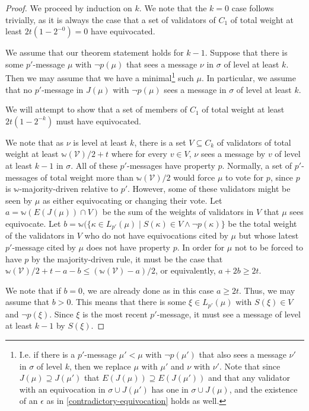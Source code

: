 \documentclass[12pt]{article}
\begin{document}
\begin{proof}
We proceed by induction on $k$. We note that the $k=0$ case follows trivially, as it is always the case that a set of validators of $C_1$ of total weight at least $2t(1-2^{-0})=0$ have equivocated.

  We assume that our theorem statement holds for $k-1$. Suppose that there is some $p'$-message $\mu$ with $\neg p(\mu)$ that sees a message $\nu$ in $\sigma$ of level at least $k$. Then we may assume that we have a minimal\footnote{I.e. if there is a $p'$-message $\mu' < \mu$ with $\neg p(\mu')$ that also sees a message $\nu'$ in $\sigma$ of level $k$, then we replace $\mu$ with $\mu'$ and $\nu$ with $\nu'$. Note that since $J(\mu)\supseteq J(\mu')$ that $E(J(\mu))\supseteq E(J(\mu'))$ and that any validator with an equivocation in $\sigma\cup J(\mu')$ has one in $\sigma\cup J(\mu)$, and the existence of an $\epsilon$ as in \ref{contradictory-equivocation} holds as well.} such $\mu$. In particular, we assume that no $p'$-message in $J(\mu)$ with $\neg p(\mu)$ sees a message in $\sigma$ of level at least $k$.

We will attempt to show that a set of members of $C_1$ of total weight at least $2t(1-2^{-k})$ must have equivocated.

  We note that as $\nu$ is level at least $k$, there is a set $V\subseteq C_k$ of validators of total weight at least $\mathbb{w}(\mathcal{V})/2+t$ where for every $v\in V$, $\nu$ sees a message by $v$ of level at least $k-1$ in $\sigma$. All of these $p'$-messages have property $p$. Normally, a set of $p'$-messages of total weight more than $\mathbb{w}(\mathcal{V})/2$ would force $\mu$ to vote for $p$, since $p$ is $\mathbb{w}$-majority-driven relative to $p'$. However, some of these validators might be seen by $\mu$ as either equivocating or changing their vote. Let $a = \mathbb{w}(E(J(\mu)) \cap V)$ be the sum of the weights of validators in $V$ that $\mu$ sees equivocate. Let $b = \mathbb{w}(\{\kappa \in L_{p'}(\mu) \mid S(\kappa) \in V \wedge \neg p(\kappa)\}$ be the total weight of the validators in $V$ who do not have equivocations cited by $\mu$ but whose latest $p'$-message cited by $\mu$ does not have property $p$. In order for $\mu$ not to be forced to have $p$ by the majority-driven rule, it must be the case that $\mathbb{w}(\mathcal{V})/2+t-a-b \leq (\mathbb{w}(\mathcal{V})-a)/2$, or equivalently, $a+2b \geq 2t$.

  We note that if $b=0$, we are already done as in this case $a\geq 2t$. Thus, we may assume that $b > 0$. This means that there is some $\xi \in L_{p'}(\mu)$ with $S(\xi) \in V$ and $\neg p(\xi)$. Since $\xi$ is the most recent $p'$-message, it must see a message of level at least $k - 1$ by $S(\xi)$.


\end{proof}
\end{document}
